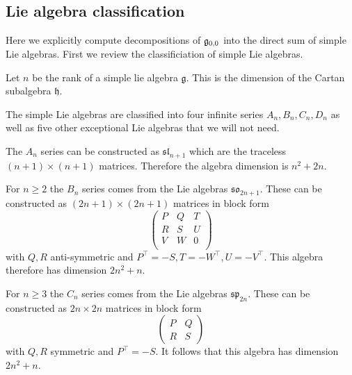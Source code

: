 \documentclass[12pt]{article}
\begin{document}



\subsection{Lie algebra classification}

Here we explicitly compute decompositions of $\mathfrak{g}_{0,0}$
into the direct sum of simple Lie algebras.
First we review the classificiation of simple Lie algebras.

Let $n$ be the rank of a simple lie algebra $\mathfrak{g}.$
This is the dimension of the Cartan subalgebra $\mathfrak{h}.$

The simple Lie algebras are classified into four infinite series
$A_n, B_n, C_n, D_n$ as well as five other exceptional Lie
algebras that we will not need.

The $A_n$ series can be
constructed as 
$\mathfrak{sl}_{n+1}$ which are the traceless $(n+1)\times (n+1)$ matrices. 
Therefore the algebra dimension is $n^2 + 2n.$

For $n\ge 2$ the $B_n$ series 
comes from the Lie algebras
$\mathfrak{so}_{2n+1}$.
These can be constructed as $(2n+1)\times(2n+1)$ matrices
in block form 
$$
\left(\begin{array}{lll}
P & Q & T\\
R & S & U\\
V & W & 0\\
\end{array}\right)
$$
with $Q,R$ anti-symmetric and 
$P^{\top}=-S,T=-W^{\top},U=-V^{\top}.$
This algebra therefore has dimension $2n^2 + n.$

For $n\ge 3$ the $C_n$ series
comes from the Lie algebras
$\mathfrak{sp}_{2n}$.
These can be constructed as $2n\times2n$ matrices
in block form 
$$
\left(\begin{array}{ll}
P & Q \\
R & S
\end{array}\right)
$$
with 
$Q,R$ symmetric and $P^{\top}=-S.$
It follows that this algebra has dimension $2n^2 + n.$
\end{document}
